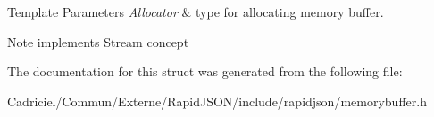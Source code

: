 \begin{DoxyTemplParams}{Template Parameters}
{\em Allocator} & type for allocating memory buffer. \\
\hline
\end{DoxyTemplParams}
\begin{DoxyNote}{Note}
implements Stream concept 
\end{DoxyNote}


The documentation for this struct was generated from the following file\+:\begin{DoxyCompactItemize}
\item 
Cadriciel/\+Commun/\+Externe/\+Rapid\+J\+S\+O\+N/include/rapidjson/memorybuffer.\+h\end{DoxyCompactItemize}
